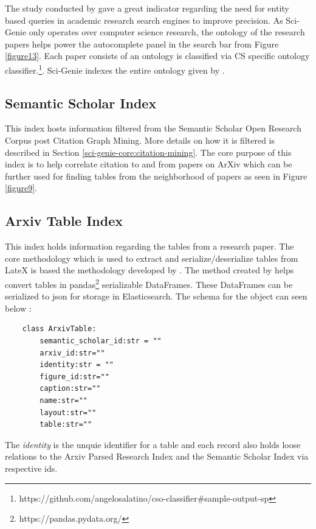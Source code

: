 The study conducted by \cite{li2017investigating} gave a great indicator regarding the need for entity based queries in academic research search engines to improve precision. As Sci-Genie only operates over computer science research, the ontology of the research papers helps power the autocomplete panel in the search bar from Figure \ref{figure13}. Each paper consists of an ontology is classified via CS specific ontology classifier.\footnote{https://github.com/angelosalatino/cso-classifier\#sample-output-sp}. Sci-Genie indexes the entire ontology given by \cite{salatino2020ontology}. 

\subsection{Semantic Scholar Index}
\label{sci-genie-core:data-layer:ss-index}
This index hosts information filtered from the Semantic Scholar Open Research Corpus\parencite{ammar-etal-2018-construction} post Citation Graph Mining. More details on how it is filtered is described in Section \ref{sci-genie-core:citation-mining}. The core purpose of this index is to help correlate citation to and from papers on ArXiv which can be further used for finding tables from the neighborhood of papers as seen in Figure \ref{figure9}. 


\subsection{Arxiv Table Index}
\label{sci-genie-core:data-layer:table-index}
This index holds information regarding the tables from a research paper. The core methodology which is used to extract and serialize/deserialize tables from LateX is based the methodology developed by \cite{kardas2020axcell}. The method created by  \cite{kardas2020axcell} helps convert tables in pandas\footnote{https://pandas.pydata.org/} serializable DataFrames. These DataFrames can be serialized to json for storage in Elasticsearch. The schema for the object can seen below : 
\begin{verbatim}
    class ArxivTable:
        semantic_scholar_id:str = ""
        arxiv_id:str=""
        identity:str = ""
        figure_id:str=""
        caption:str=""
        name:str=""
        layout:str=""
        table:str=""
\end{verbatim}

The \textit{identity} is the unquie identifier for a table and each record also holds loose relations to the Arxiv Parsed Research Index and the Semantic Scholar Index via respective ids. 

